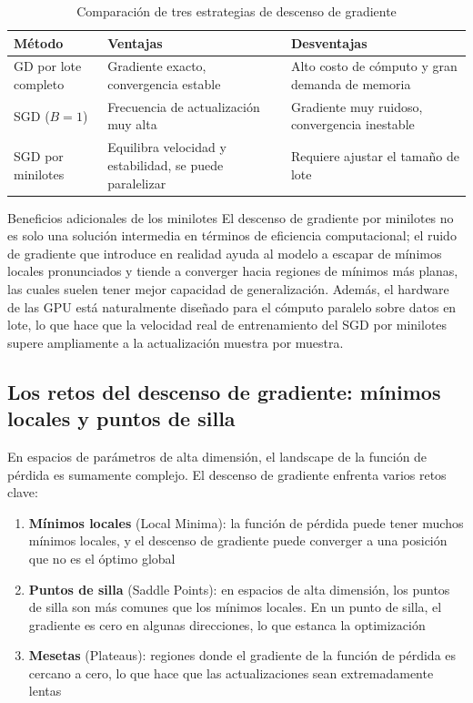 \begin{table}[H]
\centering
\begin{tabular}{lp{4.5cm}p{4.5cm}}
\toprule
\textbf{Método} & \textbf{Ventajas} & \textbf{Desventajas} \\
\midrule
GD por lote completo & Gradiente exacto, convergencia estable & Alto costo de cómputo y gran demanda de memoria \\
SGD ($B=1$) & Frecuencia de actualización muy alta & Gradiente muy ruidoso, convergencia inestable \\
SGD por minilotes & Equilibra velocidad y estabilidad, se puede paralelizar & Requiere ajustar el tamaño de lote \\
\bottomrule
\end{tabular}
\caption{Comparación de tres estrategias de descenso de gradiente}
\end{table}

\begin{knowledgebox}{Beneficios adicionales de los minilotes}
El descenso de gradiente por minilotes no es solo una solución intermedia en términos de eficiencia computacional; el ruido de gradiente que introduce en realidad ayuda al modelo a escapar de mínimos locales pronunciados y tiende a converger hacia regiones de mínimos más planas, las cuales suelen tener mejor capacidad de generalización. Además, el hardware de las GPU está naturalmente diseñado para el cómputo paralelo sobre datos en lote, lo que hace que la velocidad real de entrenamiento del SGD por minilotes supere ampliamente a la actualización muestra por muestra.
\end{knowledgebox}

\subsection{Los retos del descenso de gradiente: mínimos locales y puntos de silla}

En espacios de parámetros de alta dimensión, el landscape de la función de pérdida es sumamente complejo. El descenso de gradiente enfrenta varios retos clave:

\begin{enumerate}
\item \textbf{Mínimos locales} (Local Minima): la función de pérdida puede tener muchos mínimos locales, y el descenso de gradiente puede converger a una posición que no es el óptimo global
\item \textbf{Puntos de silla} (Saddle Points): en espacios de alta dimensión, los puntos de silla son más comunes que los mínimos locales. En un punto de silla, el gradiente es cero en algunas direcciones, lo que estanca la optimización
\item \textbf{Mesetas} (Plateaus): regiones donde el gradiente de la función de pérdida es cercano a cero, lo que hace que las actualizaciones sean extremadamente lentas
\end{enumerate}

